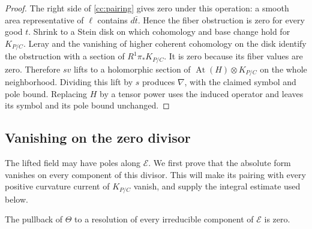 \begin{proof}
The right side of \eqref{cc:pairing} gives zero under this operation:
a smooth area representative of $\ell$ contains $d\bar t$.  Hence the
fiber obstruction is zero for every good $t$.  Shrink to a Stein disk on
which cohomology and base change hold for $K_{P/C}$.  Leray and the
vanishing of higher coherent cohomology on the disk identify the
obstruction with a section of $R^1\pi_*K_{P/C}$.  It is zero because its
fiber values are zero.  Therefore $sv$ lifts to a holomorphic section of
$\operatorname{At}(H)\otimes K_{P/C}$ on the whole neighborhood.
Dividing this lift by $s$ produces $\nabla$, with the claimed symbol and
pole bound.  Replacing $H$ by a tensor power uses the induced operator
and leaves its symbol and its pole bound unchanged.
\end{proof}

\subsection{Vanishing on the zero divisor}

The lifted field may have poles along $\mathcal E$.  We first prove
that the absolute form vanishes on every component of this divisor.
This will make its pairing with every positive curvature current of
$K_{P/C}$ vanish, and supply the integral estimate used below.

\begin{lemma}
\label{cc:zeros}
The pullback of $\Theta$ to a resolution of every irreducible component
of $\mathcal E$ is zero.
\end{lemma}

